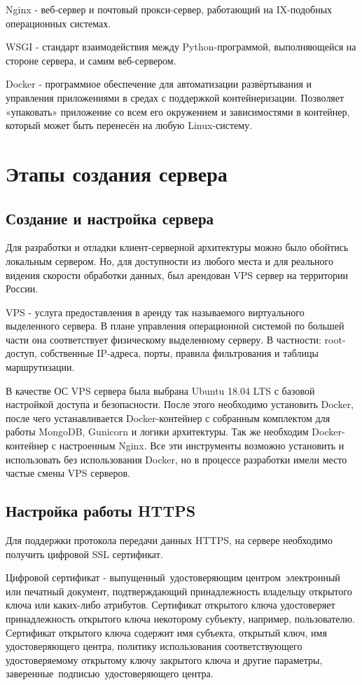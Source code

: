 \documentclass[14pt, a4paper]{extarticle}
\begin{document}
    Nginx - веб-сервер и почтовый прокси-сервер, работающий на IX-подобных операционных системах.

    WSGI - стандарт взаимодействия между Python-программой, выполняющейся на стороне сервера, и самим веб-сервером.

    Docker - программное обеспечение для автоматизации развёртывания и управления приложениями в средах с поддержкой контейнеризации. Позволяет «упаковать» приложение со всем его окружением и зависимостями в контейнер, который может быть перенесён на любую Linux-систему.


    \clearpage
    \section{Этапы создания сервера}
    \subsection{Создание и настройка сервера}
    Для разработки и отладки клиент-серверной архитектуры можно было обойтись локальным сервером. Но, для доступности из любого места и для реального видения скорости обработки данных, был арендован VPS сервер на территории России.

    VPS - услуга предоставления в аренду так называемого виртуального выделенного сервера. В плане управления операционной системой по большей части она соответствует физическому выделенному серверу. В частности: root-доступ, собственные IP-адреса, порты, правила фильтрования и таблицы маршрутизации.

    В качестве ОС VPS сервера была выбрана Ubuntu 18.04 LTS с базовой настройкой доступа и безопасности. После этого необходимо установить Docker, после чего устанавливается Docker-контейнер с собранным комплектом для работы MongoDB, Gunicorn и логики архитектуры. Так же необходим Docker-контейнер с настроенным Nginx. Все эти инструменты возможно установить и использовать без использования Docker, но в процессе разработки имели место частые смены VPS серверов.


    \clearpage
    \subsection{Настройка работы HTTPS}
    Для поддержки протокола передачи данных HTTPS, на сервере необходимо получить цифровой SSL сертификат.

    Цифровой сертификат - выпущенный удостоверяющим центром электронный или печатный документ, подтверждающий принадлежность владельцу открытого ключа или каких-либо атрибутов. Сертификат открытого ключа удостоверяет принадлежность открытого ключа некоторому субъекту, например, пользователю. Сертификат открытого ключа содержит имя субъекта, открытый ключ, имя удостоверяющего центра, политику использования соответствующего удостоверяемому открытому ключу закрытого ключа и другие параметры, заверенные подписью удостоверяющего центра.
\end{document}
